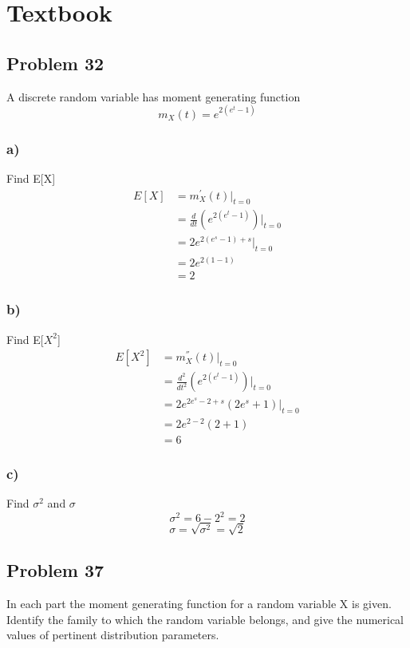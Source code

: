 \documentclass{article}
\begin{document}
\section*{Textbook}
\subsection*{Problem 32}
A discrete random variable has moment generating function 
\begin{equation}
    m_X(t) = e^{2(e^t-1)}
\end{equation}
\subsubsection*{a)}
Find E[X]
\begin{align}
    E[X] &= m^{'}_X(t)\bigg|_{t=0}\\
     &= \frac{d}{dt}(e^{2(e^t-1)})\bigg|_{t=0}\\
     &= 2e^{2\left(e^s-1\right)+s}\bigg|_{t=0}\\
     &= 2e^{2(1-1)}\\
     &= \boxed{2}
\end{align}
\subsubsection*{b)}
Find E[$X^2$]
\begin{align}
    E[X^2] &= m^{''}_X(t)\bigg|_{t=0}\\
     &= \frac{d^2}{dt^2}(e^{2(e^t-1)})\bigg|_{t=0}\\
     &= 2e^{2e^s-2+s}\left(2e^s+1\right)\bigg|_{t=0}\\
     &= 2e^{2-2}\left(2+1\right)\\
     &= \boxed{6}
\end{align}
\subsubsection*{c)}
Find $\sigma^2$ and $\sigma$
\begin{equation}
    \sigma^2 = 6 - 2^2 = \boxed{2}
\end{equation}
\begin{equation}
    \sigma = \sqrt{\sigma^2} = \boxed{\sqrt{2}}
\end{equation}
\newpage
\subsection*{Problem 37}
In each part the moment generating function for a random variable X is given. Identify the family to which the random variable belongs, and give the numerical values of pertinent distribution parameters.
\end{document}
